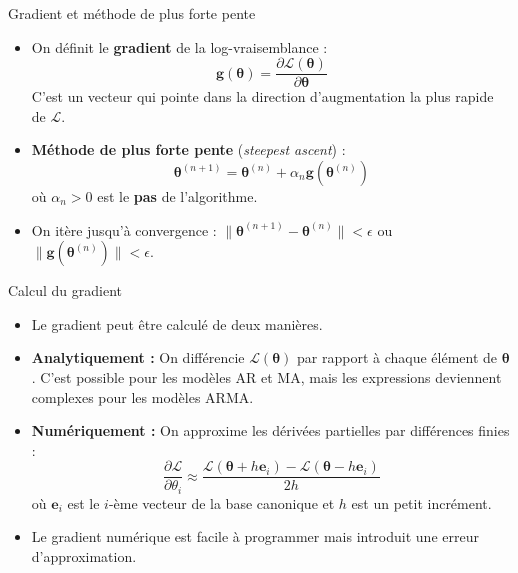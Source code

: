 \documentclass[11pt,aspectratio=169]{beamer}
\begin{document}
\begin{frame}{Gradient et méthode de plus forte pente}

\begin{itemize}

\item On définit le \textbf{gradient} de la log-vraisemblance :
  \[
  \mathbf{g}(\bm{\theta}) = \frac{\partial \mathcal{L}(\bm{\theta})}{\partial \bm{\theta}}
  \]
  C'est un vecteur qui pointe dans la direction d'augmentation la plus rapide de $\mathcal{L}$.\newline

\item \textbf{Méthode de plus forte pente} (\emph{steepest ascent}) :
  \[
  \bm{\theta}^{(n+1)} = \bm{\theta}^{(n)} + \alpha_n \mathbf{g}(\bm{\theta}^{(n)})
  \]
  où $\alpha_n > 0$ est le \textbf{pas} de l'algorithme.\newline

\item On itère jusqu'à convergence : $\|\bm{\theta}^{(n+1)} - \bm{\theta}^{(n)}\| < \epsilon$ ou $\|\mathbf{g}(\bm{\theta}^{(n)})\| < \epsilon$.

\end{itemize}

\end{frame}

\begin{frame}{Calcul du gradient}

\begin{itemize}

\item Le gradient peut être calculé de deux manières.\newline

\item \textbf{Analytiquement :} On différencie $\mathcal{L}(\bm{\theta})$ par rapport à chaque élément de $\bm{\theta}$. C'est possible pour les modèles AR et MA, mais les expressions deviennent complexes pour les modèles ARMA.\newline

\item \textbf{Numériquement :} On approxime les dérivées partielles par différences finies :
  \[
  \frac{\partial \mathcal{L}}{\partial \theta_i} \approx \frac{\mathcal{L}(\bm{\theta} + h \mathbf{e}_i) - \mathcal{L}(\bm{\theta} - h \mathbf{e}_i)}{2h}
  \]
  où $\mathbf{e}_i$ est le $i$-ème vecteur de la base canonique et $h$ est un petit incrément.\newline

\item Le gradient numérique est facile à programmer mais introduit une erreur d'approximation.

\end{itemize}

\end{frame}
\end{document}

